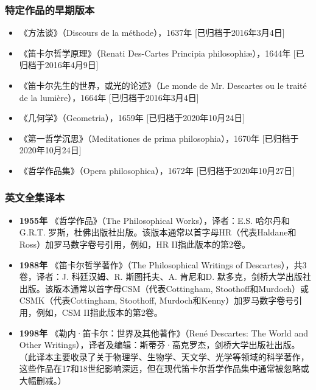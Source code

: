 \subsubsection{特定作品的早期版本}
\begin{itemize}
\item 《方法谈》（Discours de la méthode），1637年 [已归档于2016年3月4日]
\item 《笛卡尔哲学原理》（Renati Des-Cartes Principia philosophiæ），1644年 [已归档于2016年4月9日]
\item 《笛卡尔先生的世界，或光的论述》（Le monde de Mr. Descartes ou le traité de la lumière），1664年 [已归档于2016年3月4日]
\item 《几何学》（Geometria），1659年 [已归档于2020年10月24日]
\item 《第一哲学沉思》（Meditationes de prima philosophia），1670年 [已归档于2020年10月24日]
\item 《哲学作品集》（Opera philosophica），1672年 [已归档于2020年10月27日]
\end{itemize}
\subsubsection{英文全集译本}
\begin{itemize}
\item \textbf{1955年} 《哲学作品》（The Philosophical Works），译者：E.S. 哈尔丹和G.R.T. 罗斯，杜佛出版社出版。该版本通常以首字母HR（代表Haldane和Ross）加罗马数字卷号引用，例如，HR II指此版本的第2卷。
\item \textbf{1988年} 《笛卡尔哲学著作》（The Philosophical Writings of Descartes），共3卷，译者：J. 科廷汉姆、R. 斯图托夫、A. 肯尼和D. 默多克，剑桥大学出版社出版。该版本通常以首字母CSM（代表Cottingham, Stoothoff和Murdoch）或CSMK（代表Cottingham, Stoothoff, Murdoch和Kenny）加罗马数字卷号引用，例如，CSM II指此版本的第2卷。
\item \textbf{1998年} 《勒内·笛卡尔：世界及其他著作》（René Descartes: The World and Other Writings），译者及编辑：斯蒂芬·高克罗杰，剑桥大学出版社出版。（此译本主要收录了关于物理学、生物学、天文学、光学等领域的科学著作，这些作品在17和18世纪影响深远，但在现代笛卡尔哲学作品集中通常被忽略或大幅删减。）
\end{itemize}
